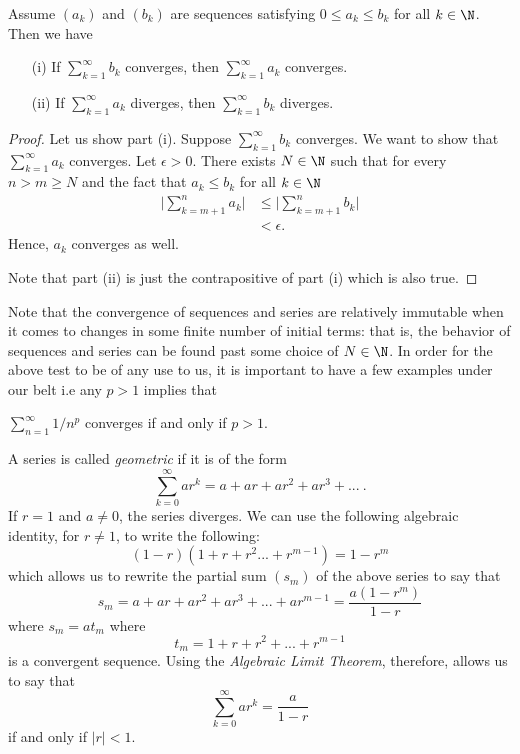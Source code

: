 \begin{tcolorbox}
    \begin{thm}
Assume \((a_k)\) and \((b_k)\) are sequences satisfying \( 0 \leq a_k \leq b_k \) for all \( k \in \N \). Then we have 

\begin{enumerate}
    \item[(i)] If \( \sum_{k=1}^{\infty}b_k\) converges, then \( \sum_{k=1}^{\infty} a_k\) converges.
    \item[(ii)] If \( \sum_{k=1}^{\infty} a_k\) diverges, then \( \sum_{k=1}^{\infty} b_k\) diverges.
\end{enumerate}
\end{thm}
\end{tcolorbox}

\begin{proof}
Let us show part (i). Suppose \( \sum_{k=1}^{\infty} b_k \) converges. We want to show that \( \sum_{k=1}^{\infty} a_k\) converges. Let \( \epsilon > 0 \). There exists \( N \in \N \) such that for every \( n > m \geq N \) and the fact that \( a_k \leq b_k\) for all \(k \in \N \) 
\begin{align*}
    \Big|\sum_{k=m+1}^{n} a_k \Big| &\leq \Big|\sum_{k=m+1}^{n}b_k\Big| \\ 
                                    &< \epsilon.
\end{align*}
Hence, \(a_k\) converges as well. 

Note that part (ii) is just the contrapositive of part (i) which is also true. 
\end{proof}

Note that the convergence of sequences and series are relatively immutable when it comes to changes in some finite number of initial terms: that is, the behavior of sequences and series can be found past some choice of \( N \in \N \). In order for the above test to be of any use to us, it is important to have a few examples under our belt i.e any \( p > 1 \) implies that 
\begin{center}
    \( \sum_{n=1}^{\infty} 1/ n^p\) converges if and only if \( p > 1\).    
\end{center}

\begin{ex}
A series is called \textit{geometric} if it is of the form 
\[ \sum_{k=0}^{\infty} ar^k = a + ar + ar^2 + ar^3 + ... ~ .\]
If \( r = 1 \) and \( a \neq  0\), the series diverges. We can use the following algebraic identity, for \( r \neq 1 \), to write the following: 
\[ (1-r)(1 + r + r^2 ... + r^{m-1}) = 1 - r^m\]
which allows us to rewrite the partial sum \( (s_m)\) of the above series to say that 
\[ s_m = a+ ar + ar^2 + ar^3 + ... + a r^{m-1} = \frac{a(1-r^m)}{1-r}\]
where \( s_m = at_{m}\) where 
\[ t_m = 1 + r + r^2 + ... + r^{m-1}\]
is a convergent sequence.
Using the \textit{Algebraic Limit Theorem}, therefore, allows us to say that 
\[ \sum_{k=0}^{\infty} ar^k = \frac{a}{1-r}\]
if and only if \( |r| < 1\).
\end{ex}

